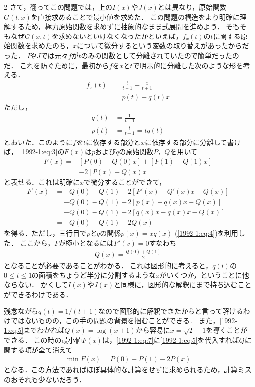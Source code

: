\documentclass[../../main.tex]{subfiles}
\begin{document}
\begin{multicols}{2}
  さて，翻ってこの問題では，上の$I(x)$や$J(x)$とは異なり，原始関数$G(t,x)$を直接求めることで最小値を求めた．
  この問題の構造をより明確に理解するため，極力原始関数を求めずに抽象的なまま式展開を進めよう．
  そもそもなぜ$G(x,t)$を求めないといけなくなったかといえば，$f_{x}(t)$の$t$に関する原始関数を求めたのち，$x$について微分するという変数の取り替えがあったからだった．
  $I$や$J$では元々$f$が$t$のみの関数として分離されていたので簡単だったのだ．
  これを防ぐために，最初から$f$を$x$と$t$で明示的に分離した次のような形を考える．
  \begin{align}
    f_{x}(t)
     & = \frac{t}{t+1} - \frac{x}{t+1} \\
     & = p(t) - q(t) x
  \end{align}
  ただし，
  \begin{align}
    q(t) & = \frac{1}{t+1}                             \\
    p(t) & = \frac{t}{t+1} = tq(t) \label{1992-1:eq:4}
  \end{align}
  とおいた．このように$f$を$t$に依存する部分と$x$に依存する部分に分離して書けば，
  \cref{1992-1:eq:3}の$F(x)$は$p$および$q$の原始関数$P$，$Q$を用いて
  \begin{align}
    F(x) =
     & \left[P(0)-Q(0)x \right] + \left[P(1)-Q(1)x \right] \\
     & -2 \left[P(x)-Q(x)x \right]\label{1992-1:eq:7}
  \end{align}
  と表せる．これは明確に$x$で微分することができて，
  \begin{align*}
    F'(x)
     & = -Q(0) - Q(1) -2 \left[P'(x)-Q'(x)x -Q(x)\right] \\
     & = -Q(0) - Q(1) -2 \left[p(x)-q(x)x -Q(x)\right]   \\
     & = -Q(0) - Q(1) -2 \left[q(x)x-q(x)x -Q(x)\right]  \\
     & = -Q(0) - Q(1) + 2Q(x)
  \end{align*}
  を得る．ただし，三行目で$p$と$q$の関係$p(x)=xq(x)$ (\cref{1992-1:eq:4})を利用した．
  ここから，$F$が極小となるには$F'(x)=0$すなわち
  \begin{align}
    Q(x) = \frac{Q(0)+Q(1)}{2} \label{1992-1:eq:5}
  \end{align}
  となることが必要であることがわかる．
  これは図形的に考えると，$q(t)$の$0\le t\le 1$の面積をちょうど半分に分割するような$x$がいくつか，ということに他ならない．
  かくして$I(x)$や$J(x)$と同様に，図形的な解釈にまで持ち込むことができるわけである．

  残念ながら$q(t)=1/(t+1)$なので図形的に解釈できたからと言って解けるわけではないものの，この手の問題の背景を掴むことができる．
  また，\cref{1992-1:eq:5}までわかれば$Q(x) = \log (x+1)$から容易に$x=\sqrt{2}-1$を導くことができる．
  この時の最小値$F(x)$は，\cref{1992-1:eq:7}に\cref{1992-1:eq:5}を代入すれば$Q$に関する項が全て消えて
  \begin{align}
    \min F(x) = P(0) + P(1) - 2P(x)
  \end{align}
  となる．この方法であればほぼ具体的な計算をせずに求められるため，計算ミスのおそれも少ないだろう．

  \newpage
\end{multicols}
\end{document}
